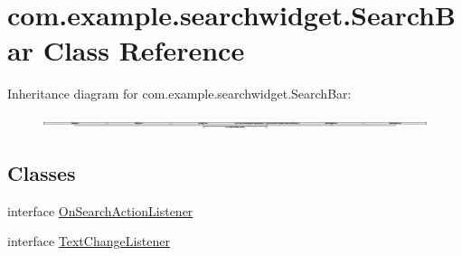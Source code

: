 \hypertarget{classcom_1_1example_1_1searchwidget_1_1_search_bar}{}\section{com.\+example.\+searchwidget.\+Search\+Bar Class Reference}
\label{classcom_1_1example_1_1searchwidget_1_1_search_bar}
Inheritance diagram for com.\+example.\+searchwidget.\+Search\+Bar\+:\begin{figure}[H]
\begin{center}
\leavevmode
\includegraphics[height=0.255009cm]{classcom_1_1example_1_1searchwidget_1_1_search_bar}
\end{center}
\end{figure}
\subsection*{Classes}
\begin{DoxyCompactItemize}
\item 
interface \mbox{\hyperlink{interfacecom_1_1example_1_1searchwidget_1_1_search_bar_1_1_on_search_action_listener}{On\+Search\+Action\+Listener}}
\item 
interface \mbox{\hyperlink{interfacecom_1_1example_1_1searchwidget_1_1_search_bar_1_1_text_change_listener}{Text\+Change\+Listener}}
\end{DoxyCompactItemize}
